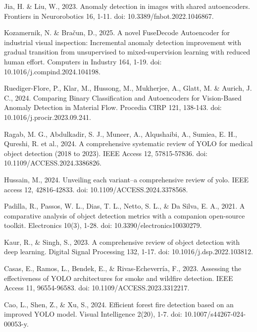\begin{thebibliography}{9}
  Jia, H. \& Liu, W., 2023. Anomaly detection in images with shared
  autoencoders. Frontiers in Neurorobotics 16, 1-11. doi:
  10.3389/fnbot.2022.1046867.

  Kozamernik, N. \& Bračun, D., 2025. A novel FuseDecode Autoencoder
  for industrial visual inspection: Incremental anomaly detection
  improvement with gradual transition from unsupervised to
  mixed-supervision learning with reduced human effort. Computers in
  Industry 164, 1-19. doi: 10.1016/j.compind.2024.104198.

  Ruediger-Flore, P., Klar, M., Hussong, M., Mukherjee, A., Glatt,
  M. \& Aurich, J. C., 2024. Comparing Binary Classification and
  Autoencoders for Vision-Based Anomaly Detection in Material Flow.
  Procedia CIRP 121, 138-143. doi: 10.1016/j.procir.2023.09.241.

  Ragab, M. G., Abdulkadir, S. J., Muneer, A., Alqushaibi, A.,
  Sumiea, E. H., Qureshi, R. et al., 2024. A
  comprehensive systematic review of YOLO for medical object
  detection (2018 to 2023). IEEE Access 12, 57815-57836. doi:
  10.1109/ACCESS.2024.3386826.

  Hussain, M., 2024. Unveiling each variant–a comprehensive review of
  yolo. IEEE access 12, 42816-42833. doi: 10.1109/ACCESS.2024.3378568.

  Padilla, R., Passos, W. L., Dias, T. L., Netto, S. L., \& Da Silva,
  E. A., 2021. A comparative analysis of object detection metrics
  with a companion open-source toolkit. Electronics 10(3), 1-28. doi:
  10.3390/electronics10030279.

  Kaur, R., \& Singh, S., 2023. A comprehensive review of object
  detection with deep learning. Digital Signal Processing 132, 1-17.
  doi: 10.1016/j.dsp.2022.103812.

  Casas, E., Ramos, L., Bendek, E., \& Rivas-Echeverría, F., 2023.
  Assessing the effectiveness of YOLO architectures for smoke and
  wildfire detection. IEEE Access 11, 96554-96583. doi:
  10.1109/ACCESS.2023.3312217.

  Cao, L., Shen, Z., \& Xu, S., 2024. Efficient forest fire detection
  based on an improved YOLO model. Visual Intelligence 2(20), 1-7.
  doi: 10.1007/s44267-024-00053-y.


\end{thebibliography}
